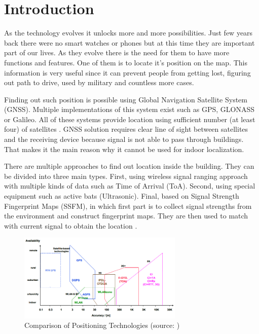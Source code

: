 \chapter{Introduction}\label{sec:Introduction}
\setcounter{page}{1}
As the technology evolves it unlocks more and more possibilities. Just few years back there were no smart watches or phones but at this time they are important part of our lives. As they evolve there is the need for them to have more functions and features. One of them is to locate it's position on the map. This information is very useful since it can prevent people from getting lost, figuring out path to drive, used by military and countless more cases.

Finding out such position is possible using Global Navigation Satellite System (GNSS). Multiple implementations of this system exist such as GPS, GLONASS or Galileo. All of these systems provide location using sufficient number (at least four) of satellites \cite{GNSS, GNSSGPS}. GNSS solution requires clear line of sight between satellites and the receiving device because signal is not able to pass through buildings. That makes it the main reason why it cannot be used for indoor localization.

There are multiple approaches to find out location inside the building. They can be divided into three main types. First, using wireless signal ranging approach with multiple kinds of data such as Time of Arrival (ToA). Second, using special equipment such as active bats (Ultrasonic). Final, based on Signal Strength Fingerprint Maps (SSFM), in which first part is to collect signal strengths from the environment and construct fingerprint maps. They are then used to match with current signal to obtain the location \cite{LocalizationApproaches}.

\begin{figure}[h!]
	\begin{centering}
		\includegraphics[width=0.7\textwidth]{img/1_comparison_of_positionin_technologies}
		\par\end{centering}
	\caption{Comparison of Positioning Technologies (source: \cite{PedestrianDeadReckoning})\label{fig:1_comparison_of_positionin_technologies}}
	\label{fig01c01}
\end{figure}

